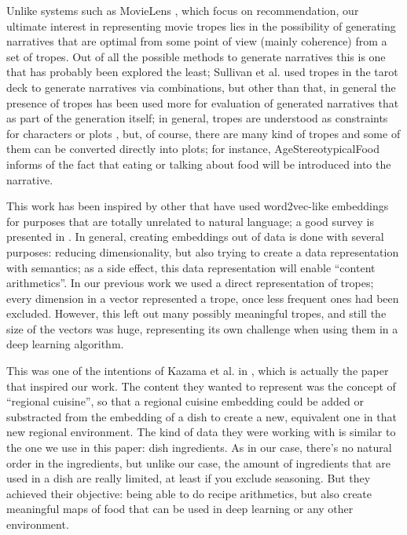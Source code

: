 \documentclass[letterpaper]{article}
\begin{document}
	Unlike systems such as MovieLens \cite{10.1145/2827872}, which focus
	on recommendation, our ultimate
	interest in representing movie tropes lies in the possibility of
	generating narratives \cite{10.5555/931357} that are optimal from some point of view (mainly
	coherence) from a set of tropes. Out of all the possible methods to
	generate narratives \cite{van2019narrative} this is one that has
	probably been explored the least; Sullivan et
	al. \cite{10.1145/3235765.3235819} used tropes in the tarot deck to
	generate narratives via combinations, but other than that, in general
	the presence of tropes has been used more for evaluation of generated
	narratives \cite{gervas2012story} that as part of the generation
	itself; in general, tropes are understood as constraints for
	characters or plots \cite{Thompson18NarrativeEvents}, but, of course,
	there are many kind of tropes and some of them can be converted
	directly into plots; for instance, {\sf AgeStereotypicalFood} informs
	of the fact that eating or talking about food will be introduced into
	the narrative.
	
	This work has been inspired by other that have used
	word2vec-like embeddings for purposes that are totally
	unrelated to natural language; a good survey is presented in
	\cite{nonnlp19}. In general, creating embeddings out of data
	is done with several purposes: reducing dimensionality, but
	also trying to create a data representation with semantics; as
	a side effect, this data representation will enable ``content
	arithmetics''. In our previous work
	\cite{doi:10.1111/exsy.12525} we used a direct representation
	of tropes; every dimension in a vector represented a trope,
	once less frequent ones had been excluded. However, this left
	out many possibly meaningful tropes, and still the size of the
	vectors was huge, representing its own challenge when using
	them in a deep learning algorithm.
	
	This was one of the intentions of Kazama et al. in
	\cite{kazama2018}, which is actually the paper that inspired
	our work. The content they wanted to represent was the concept
	of ``regional cuisine'', so that a regional cuisine embedding
	could be added or substracted from the embedding of a dish to
	create a new, equivalent one in that new regional
	environment. The kind of data they were working with is
	similar to the one we use in this paper: dish ingredients. As
	in our case, there's no natural order in the ingredients, but
	unlike our case, the amount of ingredients that are used in a
	dish are really limited, at least if you exclude
	seasoning. But they achieved their objective: being able to do
	recipe arithmetics, but also create meaningful maps of food
	that can be used in deep learning or any other environment.
	
\end{document}
